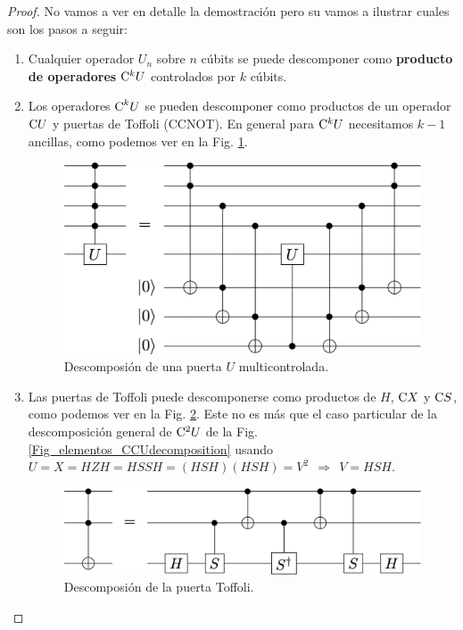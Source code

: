 \documentclass[a4paper,11pt]{book} %
\numberwithin{equation}{chapter}
\newcommand{\cg}[1]{{\rm C}#1}
\begin{document}
	\begin{proof}
	No vamos a ver en detalle la demostración pero su vamos a ilustrar cuales son los pasos a seguir:
	\begin{enumerate}
		\item Cualquier operador $U_n$ sobre $n$ cúbits se puede descomponer como \textbf{producto de operadores} $\cg{^kU}$ 
		controlados por $k$ cúbits.
		
		\item Los operadores $\hbox{C}^kU$ se pueden descomponer como productos de un  operador $\cg{U}$ y puertas de Toffoli (CCNOT).
		En general para $\cg{^kU}$ necesitamos $k-1$ ancillas, como podemos ver en la Fig. \ref{Fig_universal_CkUdecomposition}.
			\begin{figure}[H]
			\centering 
			\includegraphics[width=0.65\linewidth]{Figuras/Fig_universal_CkUdecomposition}
			\caption{Descomposión de una puerta $U$ multicontrolada.}
			\label{Fig_universal_CkUdecomposition}
			\end{figure}


		\item Las puertas de Toffoli puede descomponerse como productos de $H$, $\cg{X}$ y $\cg{S}$, como podemos ver en la 
		Fig. \ref{Fig_universal_Toffolidecomposition}. Este no es más que el caso particular  de la descomposición general 
		de $\cg{^2U}$ de la Fig. \ref{Fig_elementos_CCUdecomposition} usando 
		$U = X = HZH=HSSH =  (HSH)(HSH)= V^2 ~~\Rightarrow ~~V = HSH$.
			\begin{figure}[H]
			\centering 
			\includegraphics[width=0.65\linewidth]{Figuras/Fig_universal_Toffolidecomposition}
			\caption{Descomposión de la puerta Toffoli.}
			\label{Fig_universal_Toffolidecomposition}
			\end{figure}


\end{enumerate}
\end{proof}
\end{document}
